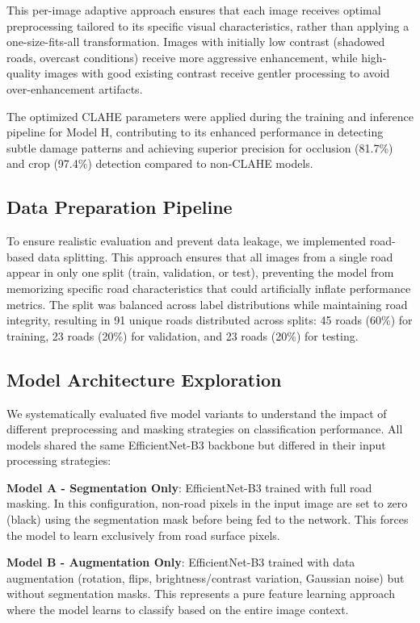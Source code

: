 \documentclass[12pt]{article}
\begin{document}
This per-image adaptive approach ensures that each image receives optimal preprocessing tailored to its specific visual characteristics, rather than applying a one-size-fits-all transformation. Images with initially low contrast (shadowed roads, overcast conditions) receive more aggressive enhancement, while high-quality images with good existing contrast receive gentler processing to avoid over-enhancement artifacts.

The optimized CLAHE parameters were applied during the training and inference pipeline for Model H, contributing to its enhanced performance in detecting subtle damage patterns and achieving superior precision for occlusion (81.7\%) and crop (97.4\%) detection compared to non-CLAHE models.

\subsection{Data Preparation Pipeline}

To ensure realistic evaluation and prevent data leakage, we implemented road-based data splitting. This approach ensures that all images from a single road appear in only one split (train, validation, or test), preventing the model from memorizing specific road characteristics that could artificially inflate performance metrics. The split was balanced across label distributions while maintaining road integrity, resulting in 91 unique roads distributed across splits: 45 roads (60\%) for training, 23 roads (20\%) for validation, and 23 roads (20\%) for testing.

\subsection{Model Architecture Exploration}

We systematically evaluated five model variants to understand the impact of different preprocessing and masking strategies on classification performance. All models shared the same EfficientNet-B3 backbone but differed in their input processing strategies:

\textbf{Model A - Segmentation Only}: EfficientNet-B3 trained with full road masking. In this configuration, non-road pixels in the input image are set to zero (black) using the segmentation mask before being fed to the network. This forces the model to learn exclusively from road surface pixels.

\textbf{Model B - Augmentation Only}: EfficientNet-B3 trained with data augmentation (rotation, flips, brightness/contrast variation, Gaussian noise) but without segmentation masks. This represents a pure feature learning approach where the model learns to classify based on the entire image context.
\end{document}
